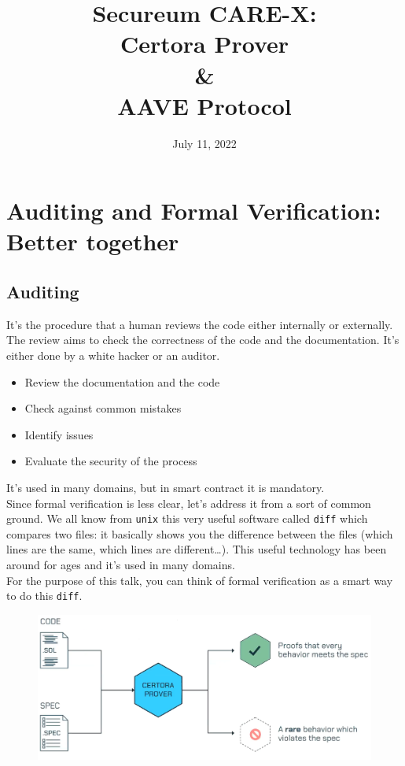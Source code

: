 \documentclass[oneside]{book}
\title{Secureum CARE-X:\\Certora Prover\\\&\\AAVE Protocol}
\date{July 11, 2022}
\begin{document}
    \maketitle

    \chapter{Auditing and Formal Verification: Better together}

    \section{Auditing}

    It's the procedure that a human reviews the code either internally or externally.
    The review aims to check the correctness of the code and the documentation.
    It's either done by a white hacker or an auditor.

    \begin{itemize}
        \item Review the documentation and the code
        \item Check against common mistakes
        \item Identify issues
        \item Evaluate the security of the process
    \end{itemize}

    It's used in many domains, but in smart contract it is mandatory.\\

    Since formal verification is less clear, let's address it from a sort of common ground.
    We all know from \texttt{unix} this very useful software called \texttt{diff} which compares two files: it basically shows you the difference between the files (which lines are the same, which lines are different\dots).
    This useful technology has been around for ages and it's used in many domains.\\

    For the purpose of this talk, you can think of formal verification as a smart way to do this \texttt{diff}.

    \begin{figure}[htbp!]
        \centering
        \includegraphics[width=\linewidth]{img/formal_verification_diff}
    \end{figure}
\end{document}
